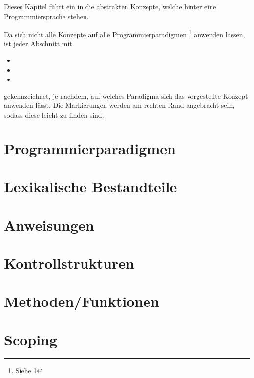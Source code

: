 Dieses Kapitel führt ein in die abstrakten Konzepte, welche hinter eine Programmiersprache stehen.

Da sich nicht alle Konzepte auf alle Programmierparadigmen \footnote{Siehe \ref{sec:paradigmen}} anwenden lassen, ist jeder Abschnitt mit
\begin{itemize}
	\item[] \functional
	\item[] \imperative
	\item[] \oop
\end{itemize}
gekennzeichnet, je nachdem, auf welches Paradigma sich das vorgestellte Konzept anwenden lässt. Die Markierungen werden am rechten Rand angebracht sein, sodass diese leicht zu finden sind.

\section{Programmierparadigmen}
	\label{sec:paradigmen}
	
	

\section{Lexikalische Bestandteile} \functionalMark \imperativeMark \oopMark
	

\section{Anweisungen} \functionalMark \imperativeMark \oopMark
	

\section{Kontrollstrukturen} \functionalMark \imperativeMark \oopMark
	

\section{Methoden/Funktionen} \functionalMark \imperativeMark \oopMark
	

\section{Scoping} \functionalMark \imperativeMark \oopMark
	

